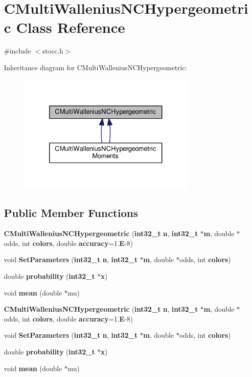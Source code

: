 \section{C\-Multi\-Wallenius\-N\-C\-Hypergeometric Class Reference}
\label{class_c_multi_wallenius_n_c_hypergeometric}


{\ttfamily \#include $<$stocc.\-h$>$}



Inheritance diagram for C\-Multi\-Wallenius\-N\-C\-Hypergeometric\-:\nopagebreak
\begin{figure}[H]
\begin{center}
\leavevmode
\includegraphics[width=252pt]{class_c_multi_wallenius_n_c_hypergeometric__inherit__graph}
\end{center}
\end{figure}
\subsection*{Public Member Functions}
\begin{DoxyCompactItemize}
\item 
{\bf C\-Multi\-Wallenius\-N\-C\-Hypergeometric} ({\bf int32\-\_\-t} {\bf n}, {\bf int32\-\_\-t} $\ast${\bf m}, double $\ast$odds, int {\bf colors}, double {\bf accuracy}=1.{\bf E}-\/8)
\item 
void {\bf Set\-Parameters} ({\bf int32\-\_\-t} {\bf n}, {\bf int32\-\_\-t} $\ast${\bf m}, double $\ast$odds, int {\bf colors})
\item 
double {\bf probability} ({\bf int32\-\_\-t} $\ast${\bf x})
\item 
void {\bf mean} (double $\ast$mu)
\item 
{\bf C\-Multi\-Wallenius\-N\-C\-Hypergeometric} ({\bf int32\-\_\-t} {\bf n}, {\bf int32\-\_\-t} $\ast${\bf m}, double $\ast$odds, int {\bf colors}, double {\bf accuracy}=1.{\bf E}-\/8)
\item 
void {\bf Set\-Parameters} ({\bf int32\-\_\-t} {\bf n}, {\bf int32\-\_\-t} $\ast${\bf m}, double $\ast$odds, int {\bf colors})
\item 
double {\bf probability} ({\bf int32\-\_\-t} $\ast${\bf x})
\item 
void {\bf mean} (double $\ast$mu)
\end{DoxyCompactItemize}
